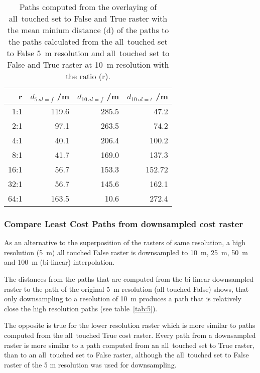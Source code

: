 \begin{table}[h!]
	\caption{Paths computed from the overlaying of all~touched set to False and True raster with the mean minium distance (d) of the paths to the paths calculated from the all~touched set to False 5~m resolution and all~touched set to False and True raster at 10~m resolution with the ratio (r).}
	\label{tab:4}
	\centering
	\begin{tabular}{ r  r  r  r}
		r & $d_{5~al=f}$ /m &  $d_{10~al=f}$ /m & $d_{10~al=t}$ /m \\
		\hline
		
		  1:1  &    119.6 &  285.5 &  47.2\\
		  2:1  &    97.1 &  263.5 &  74.2\\
		  4:1  &    40.1 &  206.4 & 100.2\\
		  8:1  &    41.7 &  169.0 & 137.3\\
		 16:1  &    56.7 &  153.3 & 152.72\\
		 32:1  &    56.7 &  145.6 & 162.1\\
		 64:1  &   163.5 &   10.6 & 272.4\\
		
	\end{tabular}
\end{table}


\subsubsection{Compare Least Cost Paths from downsampled cost raster}

As an alternative to the superposition of the rasters of same resolution, a high resolution (5~m) all touched False raster is downsampled to 10~m, 25~m, 50~m and 100~m (bi-linear) interpolation.

The distances from the paths that are computed from the bi-linear downsampled raster to the path of the original 5~m resolution (all touched False) shows, that only downsampling to a resolution of 10~m produces a path that is relatively close the high resolution paths (see table~\ref{tab:5}).

The opposite is true for the lower resolution raster which is more similar to paths computed from the all~touched True cost raster.
Every path from a downsampled raster is more similar to a path computed from an all~touched set to True raster, than to an all~touched set to False raster, although the all~touched set to False raster of the 5 m resolution was used for downsampling.

